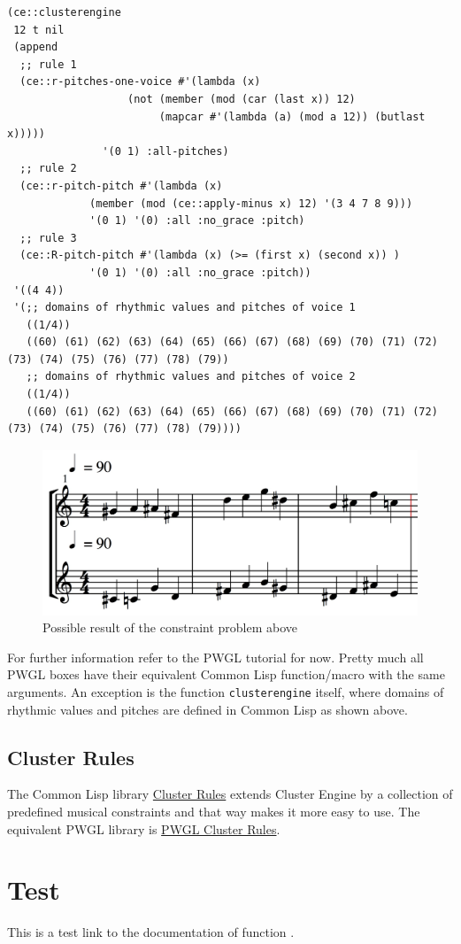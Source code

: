 \lstset{language=Lisp,label= ,caption= ,captionpos=b,numbers=none}
\begin{lstlisting}
(ce::clusterengine 
 12 t nil 
 (append 
  ;; rule 1
  (ce::r-pitches-one-voice #'(lambda (x) 
			       (not (member (mod (car (last x)) 12)
					    (mapcar #'(lambda (a) (mod a 12)) (butlast x)))))
			   '(0 1) :all-pitches)
  ;; rule 2
  (ce::r-pitch-pitch #'(lambda (x) 
			 (member (mod (ce::apply-minus x) 12) '(3 4 7 8 9)))
		     '(0 1) '(0) :all :no_grace :pitch)
  ;; rule 3
  (ce::R-pitch-pitch #'(lambda (x) (>= (first x) (second x)) )
		     '(0 1) '(0) :all :no_grace :pitch)) 
 '((4 4)) 
 '(;; domains of rhythmic values and pitches of voice 1
   ((1/4)) 
   ((60) (61) (62) (63) (64) (65) (66) (67) (68) (69) (70) (71) (72) (73) (74) (75) (76) (77) (78) (79))
   ;; domains of rhythmic values and pitches of voice 2
   ((1/4)) 
   ((60) (61) (62) (63) (64) (65) (66) (67) (68) (69) (70) (71) (72) (73) (74) (75) (76) (77) (78) (79))))
\end{lstlisting}

\begin{figure}[htbp]
\centering
\includegraphics[width=.9\linewidth]{graphics/polyphonic-solution.jpg}
\caption{Possible result of the constraint problem above}
\end{figure}


For further information refer to the PWGL tutorial for now. Pretty much all PWGL boxes have their equivalent Common Lisp function/macro with the same arguments. An exception is the function \texttt{clusterengine} itself, where domains of rhythmic values and pitches are defined in Common Lisp as shown above. 


\subsection*{Cluster Rules}
\label{sec:orgbeb68cb}

The Common Lisp library \href{https://github.com/tanders/cluster-rules}{Cluster Rules} extends Cluster Engine by a collection of predefined musical constraints and that way makes it more easy to use. The equivalent PWGL library is \href{https://github.com/tanders/pwgl-cluster-rules}{PWGL Cluster Rules}. 






\section*{Test}
\label{sec:org2c3885d}

This is a test link to the documentation of function .

